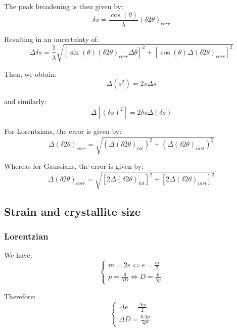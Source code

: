 \documentclass[12pt]{article}
\begin{document}
The peak broadening is then given by:
\begin{equation}
    \delta s = \frac{\cos(\theta)}{\lambda} (\delta 2\theta)_{corr}
\end{equation}

Resulting in an uncertainty of:
\begin{equation}
    \Delta \delta s = \frac{1}{\lambda}\sqrt{[\sin(\theta) (\delta 2\theta)_{corr} \Delta \theta]^2 + [\cos(\theta) \Delta (\delta 2 \theta)_{corr}]^2}
\end{equation}

Then, we obtain:
\begin{equation}
    \Delta (s^2) = 2 s \Delta s
\end{equation}

and similarly:
\begin{equation}
    \Delta [(\delta s)^2] = 2 \delta s \Delta (\delta s)
\end{equation}

For Lorentzians, the error is given by:
\begin{equation}
    \Delta (\delta 2 \theta)_{corr} = \sqrt{(\Delta (\delta 2\theta)_{tot})^2 + (\Delta (\delta 2\theta)_{inst})^2}
\end{equation}

Whereas for Gaussians, the error is given by:
\begin{equation}
    \Delta (\delta 2 \theta)_{corr} = \sqrt{[2\Delta (\delta 2 \theta)_{tot}]^2 + [2\Delta (\delta 2 \theta)_{inst}]^2}
\end{equation}

\subsection{Strain and crystallite size}

\subsubsection{Lorentzian}

We have:
\begin{equation}
    \begin{cases}
        m = 2e \Leftrightarrow e = \frac{m}{2} \\
        p = \frac{6}{5D} \Leftrightarrow D = \frac{6}{5p}
    \end{cases}
\end{equation}

Therefore: 
\begin{equation}
    \begin{cases}
        \Delta e = \frac{\Delta m}{2} \\
        \Delta D = \frac{6 \Delta p}{5 p^2}
    \end{cases}
\end{equation}
\end{document}

